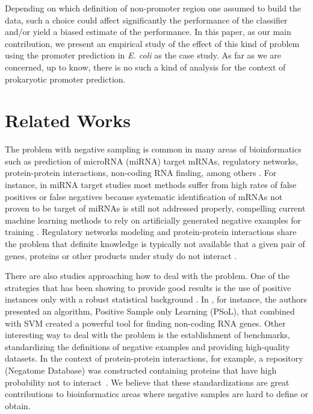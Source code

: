 \documentclass{sig-alternate}
\theoremstyle{plain}
\begin{document}
Depending on which definition of non-promoter region one assumed to  build  the data, such a choice  could affect  significantly the performance of the classifier and/or yield a biased estimate of the performance. In this paper, as our main contribution, we present an empirical study of the effect of this kind of problem using  the promoter prediction in {\it E. coli} as  the case study. As far as  we are concerned, up to know, there is no such a kind of analysis for the context of prokaryotic promoter prediction.


\section{Related Works}
\label{sec:related}

The problem with negative sampling is common in many  areas of bioinformatics such as prediction of microRNA (miRNA) target mRNAs, regulatory networks, protein-protein interactions, non-coding RNA finding, among others \cite{bandyopadhyay2009,cerulo2010,park2011,wang2006}. For instance, in miRNA target studies most methods suffer from high rates of false positives or false negatives because systematic identification of mRNAs not proven to be target of miRNAs is still not addressed properly, compelling current machine learning methods to rely on artificially generated negative examples for training \cite{bandyopadhyay2009}. Regulatory networks modeling and protein-protein interactions share the problem that definite knowledge is typically not available that a given pair of genes, proteins or other products under study do not interact \cite{cerulo2010,park2011}.

There are also studies approaching how to deal with the problem. One of the strategies that has been showing to provide good results is the use of positive instances only with a robust statistical background \cite{cerulo2010,wang2006,yousef2008}. In \cite{wang2006}, for instance, the authors presented an algorithm, Positive Sample only Learning (PSoL), that combined with SVM created a powerful tool for finding non-coding RNA genes. Other interesting way to deal with the problem  is the establishment of benchmarks, standardizing the definitions of negative examples and providing high-quality datasets. In the context of protein-protein interactions, for example,  a repository (Negatome Database) was constructed containing proteins that have high probability not to interact~\cite{smialowski2010}. We believe that these standardizations are great contributions to bioinformatics areas where negative samples are hard to define or obtain.
\end{document}
